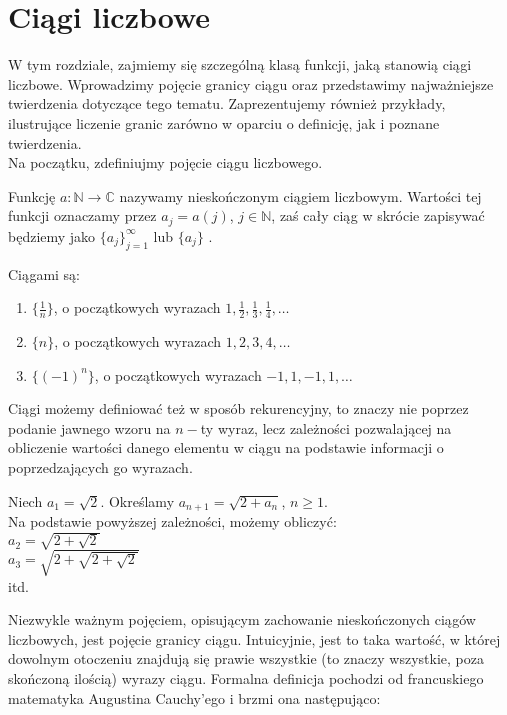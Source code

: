 \section{Ciągi liczbowe}
W tym rozdziale, zajmiemy się szczególną klasą funkcji, jaką stanowią ciągi liczbowe. Wprowadzimy pojęcie granicy ciągu oraz przedstawimy najważniejsze twierdzenia dotyczące tego tematu. Zaprezentujemy również przykłady, ilustrujące liczenie granic zarówno w oparciu o definicję, jak i poznane twierdzenia.\\
Na początku, zdefiniujmy pojęcie ciągu liczbowego.
\begin{definicja}
Funkcję $a:\mathbb{N}\rightarrow \mathbb{C}$ nazywamy nieskończonym ciągiem liczbowym. Wartości tej funkcji oznaczamy przez $a_{j}=a(j)$, $j\in \mathbb{N}$, zaś cały ciąg w skrócie zapisywać będziemy jako $\{a_{j}\}_{j=1}^{\infty}$ lub  $\{a_{j}\}$ .
\end{definicja}
\begin{przyklad}
Ciągami są:
\begin{enumerate}
\item $\{\frac{1}{n}\}$, o początkowych wyrazach $1, \frac{1}{2}, \frac{1}{3}, \frac{1}{4}, \dots$
\item $\{n\}$, o początkowych wyrazach $1, 2, 3, 4, \dots$
\item $\{(-1)^n \}$, o początkowych wyrazach $-1, 1, -1, 1, \dots$
\end{enumerate}
\end{przyklad}
Ciągi możemy definiować też w sposób rekurencyjny, to znaczy nie poprzez podanie jawnego wzoru na $n-$ty wyraz, lecz zależności pozwalającej na obliczenie wartości danego elementu w ciągu na podstawie informacji o poprzedzających go wyrazach.  
\begin{przyklad}
Niech $a_1=\sqrt{2}$. Określamy $a_{n+1}=\sqrt{2+a_n}$, $n \geq 1$. \\
Na podstawie powyższej zależności, możemy obliczyć: \\
$a_2=\sqrt{2+\sqrt{2}}$\\
$a_3=\sqrt{2+\sqrt{2+\sqrt{2}}}$\\
itd.
\end{przyklad}
Niezwykle ważnym pojęciem, opisującym zachowanie nieskończonych ciągów liczbowych, jest pojęcie granicy ciągu.  Intuicyjnie, jest to taka wartość, w której dowolnym otoczeniu znajdują się prawie wszystkie (to znaczy wszystkie, poza skończoną ilością) wyrazy ciągu. Formalna definicja pochodzi od francuskiego matematyka Augustina Cauchy'ego i brzmi ona następująco:
